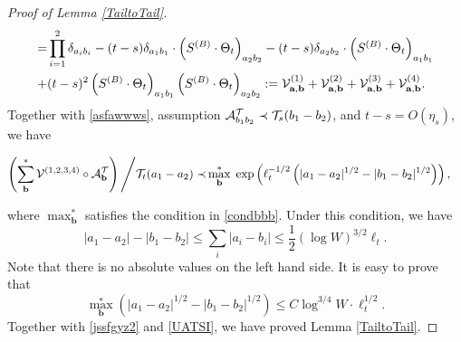 \documentclass[10pt,reqno]{article}
\theoremstyle{plain} %
\theoremstyle{remark}
\numberwithin{equation}{section}
\begin{document}
\begin{proof}[Proof of Lemma \ref{TailtoTail}]
\begin{align}
  = &  \prod_{i=1}^2 \delta_{a_ib_i}
  -(t-s) \delta_{a_1b_1}\cdot \left(S^{(B)}\cdot \Theta_t\right)_{a_2b_2}
 -(t-s) \delta_{a_2b_2}\cdot \left(S^{(B)}\cdot \Theta_t\right)_{a_1b_1}
 \\\label{ajzuis}
 + &(t-s)^2   \left(S^{(B)}\cdot \Theta_t\right)_{a_1b_1}\left(S^{(B)}\cdot \Theta_t\right)_{a_2b_2}  
 := {\cal V} ^{(1)}_{\textbf{a}, \textbf{b}}+ {\cal V} ^{(2)}_{\textbf{a}, \textbf{b}}+ {\cal V} ^{(3)}_{\textbf{a}, \textbf{b}}+ {\cal V} ^{(4)}_{\textbf{a}, \textbf{b}}.
\end{align}
Together with \eqref{asfawwws}, assumption ${\cal A}^{\cal T}_{b_1b_2}\prec {\cal T}_{s}(b_1-b_2)$, and $t-s=O(\eta_s)$,  we  have 
\begin{samepage}
\begin{align}\label{jssfgyz2}
    \left( \sum_{\textbf{b}}^* {\cal V}^{(1,2,3,4)}\circ
{\cal A}^{\cal T}_{\textbf{b}}\right)\Bigg/{\cal T}_{t }(a_1-a_2)
 \prec   &\max_{\textbf{b}}^*\;  \exp\left(  \ell_t^{-1/2}\left( |a_1-a_2|^{1/2}-|b_1-b_2|^{1/2} \right)\right),  
\end{align}
\end{samepage}
where $\max_{\textbf{b}}^*$ satisfies the condition in \eqref{condbbb}. Under this condition, we have 
$$
 |a_1-a_2|-|b_1-b_2|\le \sum_i|a_i-b_i|\le \frac12 (\log W)^{3/2}\ell_t. 
$$
Note that there is no absolute values on the left hand side. 
It is easy to prove that 
\begin{equation}\label{maxbaabb}
     \max_{\textbf{b}}^*\left( |a_1-a_2|^{1/2}-|b_1-b_2|^{1/2}\right) \le C\log^{3/4 } W\cdot \ell^{1/2}_t.
\end{equation}
Together with \eqref{jssfgyz2} and \eqref{UATSI},  %
we have proved  Lemma \ref{TailtoTail}.  
 \end{proof}
 
 \bigskip
 
\end{document}
